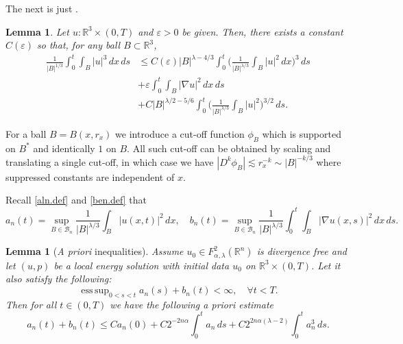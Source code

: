 \documentclass[11pt]{article}
\numberwithin{equation}{section}
\newtheorem{lem}[thm]{Lemma}
\theoremstyle{remark}
\theoremstyle{definition}
\newcommand{\cB}{\mathcal{B}}
\newcommand{\R}{\mathbb{R}}
\newcommand{\nb}{\nabla}
\newcommand\al{\alpha}
\newcommand\e {\varepsilon}  %
\newcommand\la{\lambda}
\newcommand{\esssup} {\mathop{\mathrm{ess\,sup}}}
\newcommand{\EQ}[1]{\begin{equation} #1 \end{equation}}
\newcommand{\EQN}[1]{\begin{equation*}\begin{split} #1 \end{split}\end{equation*}}
\begin{document}
The next is just \cite[Lemma 3.2]{BKT}.
\begin{lem}\label{lemma.cubic}
Let $u:\R^3\times (0,T)$ and $\e>0$ be given. Then, there exists a constant $C(\e)$ so that,  for any ball $B\subset \R^3$,
\EQN{
\frac 1 {|B|^{1/3}}\int_0^t \int_B |u|^3\,dx\,ds &\leq C(\e) |B|^{\la-4/3}\int_0^t \bigg(  \frac 1 {|B|^{\la/3}} \int_B |u|^2\,dx\bigg)^3 \,ds
\\&+ \e \int_0^t \int_B |\nb u|^2\,dx\,ds
\\&+ C |B|^{\la/2- 5/6} \int_0^t \bigg( \frac 1 {|B|^{\la/3}} \int_B |u|^2\bigg)^{3/2}\,ds.
}
\end{lem}
For a ball $B=B (x,r_x)$ we introduce a cut-off function $\phi_B$ which is supported on $B^*$ and identically $1$ on $B$. All such cut-off can be obtained by scaling and translating a single cut-off, in which case we have $|D^k \phi_B| \lesssim r_x^{-k} \sim |B|^{-k/3}$ where suppressed constants are independent of $x$.

Recall \eqref{aln.def} and \eqref{ben.def} that
\[
a_{n}(t)
= \sup_{B\in \cB_n} \frac 1 {|B|^{\la/3}}\int_B |u(x,t)|^2\,dx, \quad
b_{n}(t)=\sup_{B\in \cB_n} \frac 1 {|B|^{\la/3}}\int_0^t\int_{B}|\nb u(x,s)|^2\,dx\,ds.
\]

\begin{lem}[\textit{A priori} inequalities]\label{a.priori}
 Assume $u_0\in F^2_{\al,\la}(\R^n)$ is divergence free and let $(u,p)$ be a local energy solution with initial data $u_0$ on $\R^3\times(0,T)$. Let it also satisfy the following:
\EQ{
\esssup_{0<s<t}a_n(s)+b_n(t)< \infty, \quad \forall t<T.
}
Then for all $t\in(0,T)$ we have the following a priori estimate
\EQ{\label{grad.est.1}
a_n (t) +b_n(t)
\leq Ca_n(0) +C2^{-2n\al} \int_0^t a_n\,ds
+  C 2^{2n\al(\la-2)}\int_0^t a_n^3 \,ds .
%
}
\end{lem}
\end{document}

